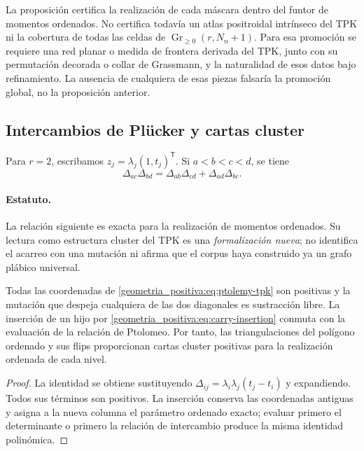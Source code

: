 La proposición certifica la realización de cada máscara dentro del funtor de
momentos ordenados. No certifica todavía un atlas positroidal intrínseco del
TPK ni la cobertura de todas las celdas de
\(\operatorname{Gr}_{\ge0}(r,N_n+1)\). Para esa promoción se requiere una red
planar o medida de frontera derivada del TPK, junto con su permutación decorada
o collar de Grassmann, y la naturalidad de esos datos bajo refinamiento. La
ausencia de cualquiera de esas piezas falsaría la promoción global, no la
proposición anterior.

\subsection{Intercambios de Plücker y cartas cluster}

Para \(r=2\), escribamos
\(z_j=\lambda_j(1,t_j)^{\mathsf T}\). Si \(a<b<c<d\), se tiene
\begin{equation}
 \Delta_{ac}\Delta_{bd}
 =\Delta_{ab}\Delta_{cd}+\Delta_{ad}\Delta_{bc}.
 \label{geometria_positiva:eq:ptolemy-tpk}
\end{equation}

\paragraph{Estatuto.}
La relación siguiente es exacta para la realización de momentos ordenados. Su
lectura como estructura cluster del TPK es una \emph{formalización nueva}; no
identifica el acarreo con una mutación ni afirma que el corpus haya construido
ya un grafo plábico universal.

\begin{proposition}
\label{geometria_positiva:thm:tpk-cluster-rank2}
Todas las coordenadas de \eqref{geometria_positiva:eq:ptolemy-tpk} son positivas y la mutación
que despeja cualquiera de las dos diagonales es sustracción libre. La inserción
de un hijo por \eqref{geometria_positiva:eq:carry-insertion} conmuta con la evaluación de la
relación de Ptolomeo. Por tanto, las triangulaciones del polígono ordenado y sus
flips proporcionan cartas cluster positivas para la realización ordenada de
cada nivel.
\end{proposition}
\begin{proof}
La identidad se obtiene sustituyendo
\(\Delta_{ij}=\lambda_i\lambda_j(t_j-t_i)\) y expandiendo. Todos sus términos
son positivos. La inserción conserva las coordenadas antiguas y asigna a la
nueva columna el parámetro ordenado exacto; evaluar primero el determinante o
primero la relación de intercambio produce la misma identidad polinómica.
\end{proof}

